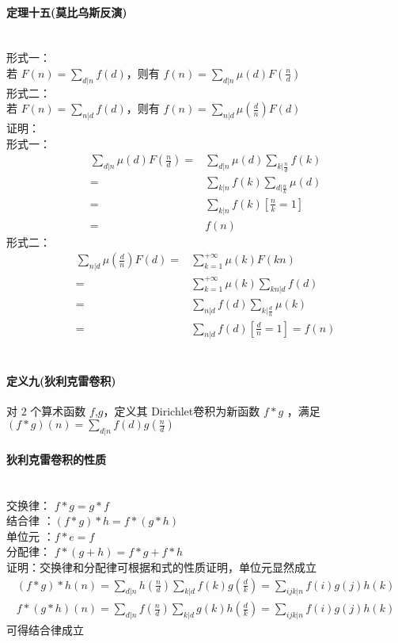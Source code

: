  	\paragraph{定理十五(莫比乌斯反演)}~\\
 	形式一：\\
 	若 $\displaystyle F(n)=\sum_{d|n}f(d)$，则有 $\displaystyle f(n)=\sum_{d|n}\mu(d)F(\frac{n}{d})$\\
 	形式二：\\
 	若 $\displaystyle F(n)=\sum_{n|d}f(d)$，则有 $\displaystyle f(n)=\sum_{n|d}\mu(\frac{d}{n})F(d)$\\
 	证明：\\
 	形式一：
 	$$
 	\begin{aligned}
 	\sum_{d|n}\mu(d)F(\frac{n}{d})=&\sum_{d|n}\mu(d)\sum_{k|\frac{n}{d}}f(k)\\=&\sum_{k|n}f(k)\sum_{d|\frac{n}{k}}\mu(d)\\=&\sum_{k|n}f(k)[\frac{n}{k}=1]\\=&f(n)
 	\end{aligned}
 	$$
 	形式二：
 	$$
 	\begin{aligned}
 	\sum_{n|d}\mu(\frac{d}{n})F(d)=&\sum_{k=1}^{+\infty }\mu(k)F(kn)\\=&\sum_{k=1}^{+\infty}\mu(k)\sum_{kn|d}f(d)\\=&\sum_{n|d}f(d)\sum_{k|\frac{d}{n}}\mu(k)\\=&\sum_{n|d}f(d)[\frac{d}{n}=1]=f(n)
 	\end{aligned}
 	$$\\
 	\paragraph{定义九(狄利克雷卷积)}对 $2$ 个算术函数 $f$,$g$，定义其 Dirichlet卷积为新函数 $f*g$ ，满足 $\displaystyle (f*g)(n)=\sum_{d|n}f(d)g(\frac{n}{d})$\\
 	\paragraph{狄利克雷卷积的性质}~\\
 	交换律： $f * g = g * f$\\
 	结合律 ：$( f * g ) * h = f * ( g * h )$\\
 	单位元 ：$f * e = f$\\
 	分配律： $f * ( g + h ) = f * g + f * h$\\
 	证明：交换律和分配律可根据和式的性质证明，单位元显然成立
 	$$
 	\begin{aligned}
 	(f*g)*h(n)=\sum_{d|n}h(\frac{n}{d})\sum_{k|d} f(k)g(\frac{d}{k})=\sum_{ijk|n}f(i)g(j)h(k)
 	\\
 	f*(g*h)(n)=\sum_{d|n}f(\frac{n}{d})\sum_{k|d} g(k)h(\frac{d}{k})=\sum_{ijk|n}f(i)g(j)h(k)
 	\end{aligned}
 	$$
 	可得结合律成立
